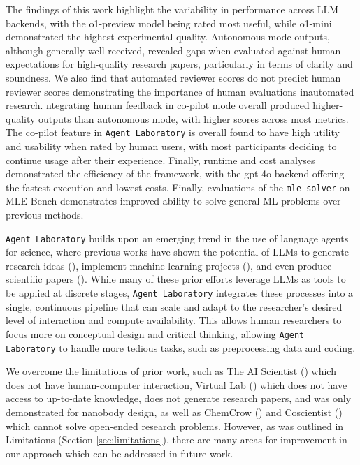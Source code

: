 \documentclass[11pt, a4paper]{gdm_format}
\begin{document}
The findings of this work highlight the variability in performance across LLM backends, with the o1-preview model being rated most useful, while o1-mini demonstrated the highest experimental quality. Autonomous mode outputs, although generally well-received, revealed gaps when evaluated against human expectations for high-quality research papers, particularly in terms of clarity and soundness. We also find that automated reviewer scores do not predict human reviewer scores demonstrating the importance of human evaluations inautomated research. ntegrating human feedback in co-pilot mode overall produced higher-quality outputs than autonomous mode, with higher scores across most metrics. The co-pilot feature in \texttt{Agent Laboratory} is overall found to have high utility and usability when rated by human users, with most participants deciding to continue usage after their experience. Finally, runtime and cost analyses demonstrated the efficiency of the framework, with the gpt-4o backend offering the fastest execution and lowest costs. Finally, evaluations of the \texttt{mle-solver} on MLE-Bench demonstrates improved ability to solve general ML problems over previous methods.



\texttt{Agent Laboratory} builds upon an emerging trend in the use of language agents for science, where previous works have shown the potential of LLMs to generate research ideas (\cite{baek2024researchagent, si2024can, li2024chain}), implement machine learning projects (\cite{chan2024mle, jing2024dsbench, huang2024mlagentbench}), and even produce scientific papers (\cite{lu2024aiscientist}). While many of these prior efforts leverage LLMs as tools to be applied at discrete stages, \texttt{Agent Laboratory} integrates these processes into a single, continuous pipeline that can scale and adapt to the researcher’s desired level of interaction and compute availability. This allows human researchers to focus more on conceptual design and critical thinking, allowing \texttt{Agent Laboratory} to handle more tedious tasks, such as preprocessing data and coding.


We overcome the limitations of prior work, such as The AI Scientist (\cite{lu2024aiscientist}) which does not have human-computer interaction, Virtual Lab (\cite{swanson2024virtual}) which does not have access to up-to-date knowledge, does not generate research papers, and was only demonstrated for nanobody design, as well as ChemCrow (\cite{m2024augmenting}) and Coscientist (\cite{boiko2023autonomous}) which cannot solve open-ended research problems. However, as was outlined in Limitations (Section \ref{sec:limitations}), there are many areas for improvement in our approach which can be addressed in future work. 
\end{document}
